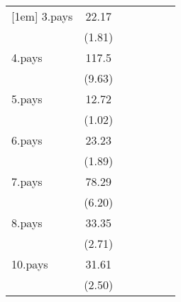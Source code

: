 {\begin{tabular}{l*{6}{c}}
[1em]
3.pays              &       22.17         &                     &                     &                     &                     &                     \\
                    &      (1.81)         &                     &                     &                     &                     &                     \\
[1em]
4.pays              &       117.5\sym{***}&                     &                     &                     &                     &                     \\
                    &      (9.63)         &                     &                     &                     &                     &                     \\
[1em]
5.pays              &       12.72         &                     &                     &                     &                     &                     \\
                    &      (1.02)         &                     &                     &                     &                     &                     \\
[1em]
6.pays              &       23.23         &                     &                     &                     &                     &                     \\
                    &      (1.89)         &                     &                     &                     &                     &                     \\
[1em]
7.pays              &       78.29\sym{***}&                     &                     &                     &                     &                     \\
                    &      (6.20)         &                     &                     &                     &                     &                     \\
[1em]
8.pays              &       33.35\sym{**} &                     &                     &                     &                     &                     \\
                    &      (2.71)         &                     &                     &                     &                     &                     \\
[1em]
10.pays             &       31.61\sym{*}  &                     &                     &                     &                     &                     \\
                    &      (2.50)         &                     &                     &                     &                     &                     \\

\end{tabular}}
